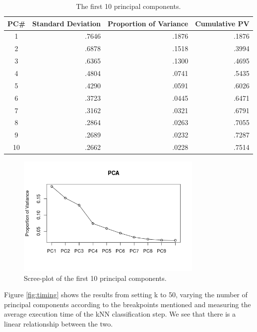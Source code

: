 \documentclass[paper=a4, fontsize=11pt]{scrartcl} %
\begin{document}
\begin{table}[h]
\centering
\caption{The first 10 principal components.}
\label{tab:pca}
\begin{tabular}{|c|r|r|r|}
\hline
PC\# & Standard Deviation & Proportion of Variance & Cumulative PV \\ \hline
1    & .7646              & .1876                  & .1876         \\
2    & .6878              & .1518                  & .3994         \\
3    & .6365              & .1300                  & .4695         \\
4    & .4804              & .0741                  & .5435         \\
5    & .4290              & .0591                  & .6026         \\
6    & .3723              & .0445                  & .6471         \\
7    & .3162              & .0321                  & .6791         \\
8    & .2864              & .0263                  & .7055         \\
9    & .2689              & .0232                  & .7287         \\
10   & .2662              & .0228                  & .7514         \\ \hline
\end{tabular}
\end{table}

\begin{figure}[h]
	\centering
	\includegraphics[width=0.8\textwidth]{scree.png}
	\caption{Scree-plot of the first 10 principal components.}
	\label{fig:scree}
\end{figure}

Figure \ref{fig:timing} shows the results from setting k to 50, varying the number of principal components according to the breakpoints mentioned and measuring the average execution time of the kNN classification step. We see that there is a linear relationship between the two.\par
\end{document}
